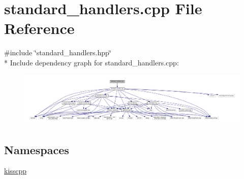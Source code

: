 \hypertarget{a00078}{\section{standard\-\_\-handlers.\-cpp File Reference}
\label{a00078}
}
{\ttfamily \#include \char`\"{}standard\-\_\-handlers.\-hpp\char`\"{}}\\*
Include dependency graph for standard\-\_\-handlers.\-cpp\-:\nopagebreak
\begin{figure}[H]
\begin{center}
\leavevmode
\includegraphics[width=350pt]{a00125}
\end{center}
\end{figure}
\subsection*{Namespaces}
\begin{DoxyCompactItemize}
\item 
\hyperlink{a00089}{kisscpp}
\end{DoxyCompactItemize}
